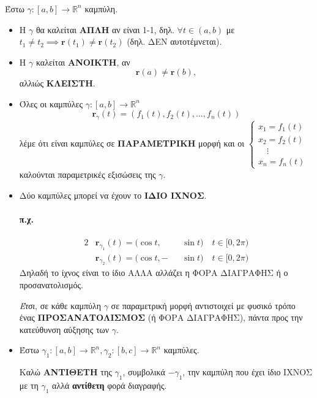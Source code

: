\documentclass[11pt,a4paper,titlepage]{article}
\begin{document}
\subsubsection*{}

Έστω \( \gamma: [a,b] \rightarrow \mathbb R ^ n \) καμπύλη.
\begin{itemize}
\item Η \(\gamma\) θα καλείται \textbf{ΑΠΛΗ} αν είναι 1-1, δηλ. \( \forall t \in (a,b) \) με \(t_1 \neq t_2 \implies \mathbf r(t_1) \neq \mathbf r(t_2)\) (δηλ. ΔΕΝ αυτοτέμνεται).

\item Η \(\gamma\) καλείται \textbf{ΑΝΟΙΚΤΗ}, αν \[\mathbf r(a) \neq \mathbf r(b),\] αλλιώς \textbf{ΚΛΕΙΣΤΗ}.

\item Όλες οι καμπύλες \(\gamma: [a,b] \rightarrow \mathbb R ^ n\) \[\mathbf r_\gamma(t) = \left( f_1(t),f_2(t),\dots,f_n(t) \right)\] λέμε ότι είναι καμπύλες σε \textbf{ΠΑΡΑΜΕΤΡΙΚΗ} μορφή και οι
\(
\begin{cases}
x_1 = f_1(t) \\
x_2 = f_2(t) \\
\quad \vdots \\
x_n = f_n(t)
\end{cases}
\) καλούνται παραμετρικές εξισώσεις της \(\gamma\).

\item Δύο καμπύλες μπορεί να έχουν το \textbf{ΙΔΙΟ ΙΧΝΟΣ}.
\paragraph{π.χ.}
\begin{alignat*}{2}
&\mathbf r_{\gamma_1}(t) = ( \cos t,  && \sin t )  \quad t \in [0, 2 \pi ) \\
&\mathbf r_{\gamma_2}(t) = ( \cos t, - && \sin t )  \quad t \in [0, 2 \pi )
\end{alignat*}
Δηλαδή το ίχνος είναι το ίδιο ΑΛΛΑ αλλάζει η ΦΟΡΑ ΔΙΑΓΡΑΦΗΣ ή ο προσανατολισμός.

\emph{Έτσι}, σε κάθε καμπύλη \(\gamma\) σε παραμετρική μορφή αντιστοιχεί με φυσικό τρόπο ένας \textbf{ΠΡΟΣΑΝΑΤΟΛΙΣΜΟΣ} (ή ΦΟΡΑ ΔΙΑΓΡΑΦΗΣ), πάντα προς την κατεύθυνση αύξησης των \(\gamma\).

\item Έστω \(\gamma_1: [a,b] \rightarrow \mathbb R^n, \gamma_2: [b,c] \rightarrow \mathbb R^n\) καμπύλες.

Καλώ \textbf{ΑΝΤΙΘΕΤΗ} της \(\gamma_1\), συμβολικά \(- \gamma_1\), την καμπύλη που έχει ίδιο ΙΧΝΟΣ με τη \(\gamma_1\) αλλά \textbf{αντίθετη} φορά διαγραφής.


\end{itemize}
\end{document}

